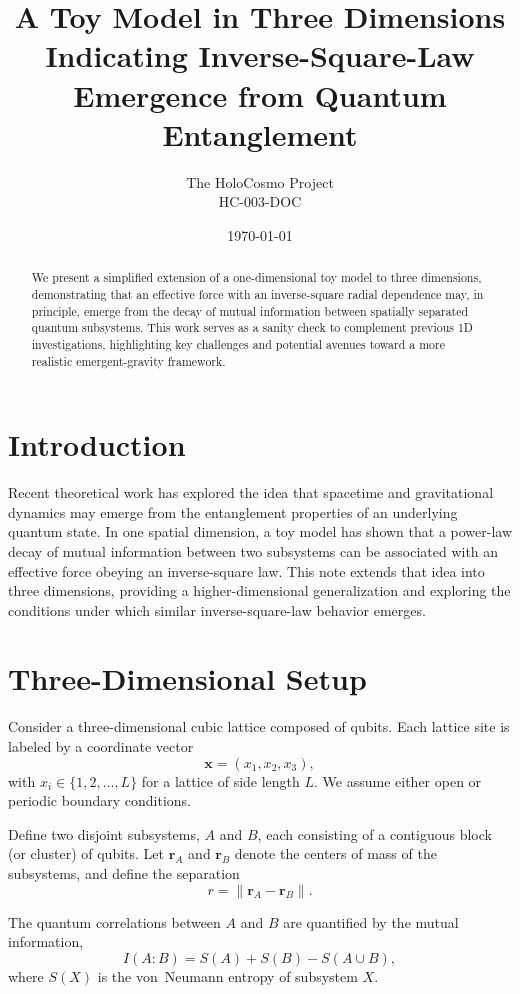 \documentclass[12pt]{article}
\title{A Toy Model in Three Dimensions Indicating Inverse-Square-Law Emergence from Quantum Entanglement}
\author{The HoloCosmo Project\\HC-003-DOC}
\date{\today}
\begin{document}
\maketitle

\begin{abstract}
We present a simplified extension of a one-dimensional toy model to three dimensions, demonstrating that an effective force with an inverse-square radial dependence may, in principle, emerge from the decay of mutual information between spatially separated quantum subsystems. This work serves as a sanity check to complement previous 1D investigations, highlighting key challenges and potential avenues toward a more realistic emergent-gravity framework.
\end{abstract}

\section{Introduction}
Recent theoretical work has explored the idea that spacetime and gravitational dynamics may emerge from the entanglement properties of an underlying quantum state. In one spatial dimension, a toy model has shown that a power-law decay of mutual information between two subsystems can be associated with an effective force obeying an inverse-square law. This note extends that idea into three dimensions, providing a higher-dimensional generalization and exploring the conditions under which similar inverse-square-law behavior emerges.

\section{Three-Dimensional Setup}
Consider a three-dimensional cubic lattice composed of qubits. Each lattice site is labeled by a coordinate vector
\[
\mathbf{x} = (x_1,x_2,x_3),
\]
with $x_i \in \{1,2,\ldots,L\}$ for a lattice of side length $L$. We assume either open or periodic boundary conditions.

Define two disjoint subsystems, $A$ and $B$, each consisting of a contiguous block (or cluster) of qubits. Let $\mathbf{r}_A$ and $\mathbf{r}_B$ denote the centers of mass of the subsystems, and define the separation
\[
r = \|\mathbf{r}_A - \mathbf{r}_B\|.
\]

The quantum correlations between $A$ and $B$ are quantified by the mutual information,
\[
I(A:B) = S(A) + S(B) - S(A \cup B),
\]
where $S(X)$ is the von~Neumann entropy of subsystem $X$.
\end{document}
